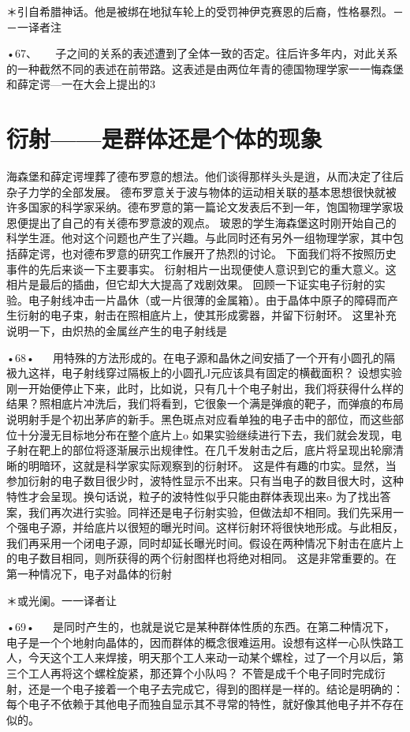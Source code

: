 ＊引自希腊神话。他是被绑在地狱车轮上的受罚神伊克赛恩的后裔，性格暴烈。－－一译者注

•67、
  
子之间的关系的表述遭到了全体一致的否定。往后许多年内，对此关系的一种截然不同的表述在前带路。这表述是由两位年青的德国物理学家一一悔森堡和薛定谔—一在大会上提出的3

\section{衍射——是群体还是个体的现象}

海森堡和薛定谔埋葬了德布罗意的想法。他们谈得那样头头是逍，从而决定了往后杂子力学的全部发展。
德布罗意关于波与物体的运动相关联的基本思想很快就被许多国家的科学家采纳。德布罗意的第一篇论文发表后不到一年，饱国物理学家圾恩便提出了自己的有关德布罗意波的观点。
玻恩的学生海森堡这时刚开始自己的科学生涯。他对这个问题也产生了兴趣。与此同时还有另外一组物理学家，其中包括薛定谔，也对德布罗意的研究工作展开了热烈的讨论。
下面我们将不按照历史事件的先后来谈一下主要事实。
衍射相片一出现便使人意识到它的重大意义。这相片是最后的插曲，但它却大大提高了戏剧效果。
回顾一下证实电子衍射的实验。电子射线冲击一片晶休（或一片很薄的金属箱）。由于晶体中原子的障碍而产生衍射的电子束，射击在照相底片上，使其形成雾器，并留下衍射环。
这里补充说明一下，由炽热的金属丝产生的电子射线是

•68•
  
用特殊的方法形成的。在电子源和晶休之间安插了一个开有小圆孔的隔衱九这祥，电子射线穿过隔板上的小圆孔J元应该具有固定的横截面积？
设想实验刚一开始便停止下来，此时，比如说，只有几十个电子射出，我们将获得什么样的结果？照相底片冲洗后，我们将看到，它很象一个满是弹痕的靶子，而弹痕的布局说明射手是个初出茅庐的新手。黑色斑点对应看单独的电子击中的部位，而这些部位十分漫无目标地分布在整个底片上o
如果实验继续进行下去，我们就会发现，电子射在靶上的部位将逐渐展示出规律性。在几千发射击之后，底片将呈现出轮廓清晰的明暗环，这就是科学家实际观察到的衍射环。
这是件有趣的巾实。显然，当参加衍射的电子数目很少时，波特性显示不出来。只有当电子的数目很大时，这种特性才会呈现。换句话说，粒子的波特性似乎只能由群体表现出来o
为了找出答案，我们再次进行实验。同祥还是电子衍射实验，但做法却不相同。我们先采用一个强电子源，并给底片以很短的曝光时间。这样衍射环将很快地形成。与此相反，我们再采用一个闭电子源，同时却延长曝光时间。假设在两种情况下射击在底片上的电子数目相同，则所获得的两个衍射图样也将绝对相同。
这是非常重要的。在第一种情况下，电子对晶体的衍射

＊或光阑。一一译者让

•69•
  
是同时产生的，也就是说它是某种群体性质的东西。在第二种情况下，电子是一个个地射向晶体的，因而群体的概念很难运用。设想有这样一心队怢路工人，今天这个工人来焊接，明天那个工人来动一动某个螺栓，过了一个月以后，第三个工人再将这个螺栓旋紧，那还算个小队吗？
不管是成千个电子同时完成衍射，还是一个电子接着一个电子去完成它，得到的图样是一样的。结论是明确的：每个电子不依赖于其他电子而独自显示其不寻常的特性，就好像其他电子并不存在似的。

